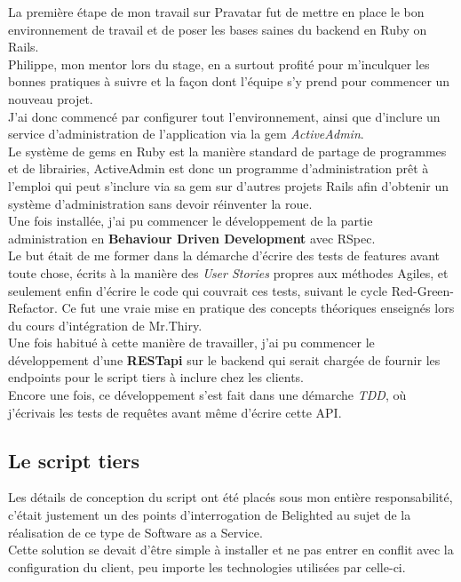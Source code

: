 \documentclass{report}
\begin{document}
      La première étape de mon travail sur Pravatar fut de mettre en place le bon environnement de travail et de poser les bases saines du backend en Ruby on Rails.\\
      Philippe, mon mentor lors du stage, en a surtout profité pour m'inculquer les bonnes pratiques à suivre et la façon dont l'équipe s'y prend pour commencer un nouveau projet.\\

      J'ai donc commencé par configurer tout l'environnement, ainsi que d'inclure un service d'administration de l'application via la gem \textit{ActiveAdmin}.\\ Le système de gems en Ruby est la manière
      standard de partage de programmes et de librairies, ActiveAdmin est donc un programme d'administration prêt à l'emploi qui peut s'inclure via sa gem sur d'autres projets Rails afin d'obtenir un système d'administration
      sans devoir réinventer la roue.\\

      Une fois installée, j'ai pu commencer le développement de la partie administration en \textbf{Behaviour Driven Development} avec RSpec.\\

      Le but était de me former dans la démarche d'écrire des tests de features avant toute chose, écrits à la manière des \textit{User Stories} propres aux méthodes Agiles, et seulement enfin
      d'écrire le code qui couvrait ces tests, suivant le cycle Red-Green-Refactor. Ce fut une vraie mise en pratique des concepts théoriques enseignés lors du cours d'intégration de Mr.Thiry.\\

      Une fois habitué à cette manière de travailler, j'ai pu commencer le développement d'une \textbf{RESTapi} sur le backend qui serait chargée de fournir les endpoints pour le script tiers
      à inclure chez les clients.\\
      Encore une fois, ce développement s'est fait dans une démarche \textit{TDD}, où j'écrivais les tests de requêtes avant même d'écrire cette API.\\

    \subsection{Le script tiers}
    \label{subs:Le script tiers}

      Les détails de conception du script ont été placés sous mon entière responsabilité, c'était justement un des points d'interrogation de Belighted au sujet de la réalisation de ce type de Software as
      a Service.\\
      Cette solution se devait d'être simple à installer et ne pas entrer en conflit avec la configuration du client, peu importe les technologies utilisées par celle-ci.\\
\end{document}
